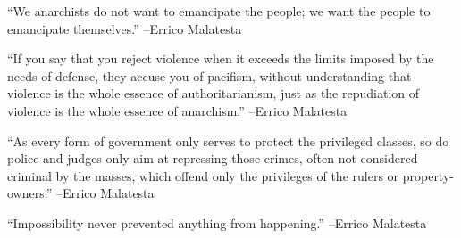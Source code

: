 \documentclass{article}%
\begin{document}
\linebreak%
\vspace{1mm}%
\begin{minipage}{\textwidth}%
\flushleft%
“We anarchists do not want to emancipate the people; we want the people to emancipate themselves.”%
\linebreak%
\vspace{1mm}%
–Errico Malatesta%
\linebreak%
\vspace{1mm}%
\end{minipage}%
\linebreak%
\vspace{1mm}%
\begin{minipage}{\textwidth}%
\flushleft%
“If you say that you reject violence when it exceeds the limits imposed by the needs of defense, they accuse you of pacifism, without understanding that violence is the whole essence of authoritarianism, just as the repudiation of violence is the whole essence of anarchism.”%
\linebreak%
\vspace{1mm}%
–Errico Malatesta%
\linebreak%
\vspace{1mm}%
\end{minipage}%
\linebreak%
\vspace{1mm}%
\begin{minipage}{\textwidth}%
\flushleft%
“As every form of government only serves to protect the privileged classes, so do police and judges only aim at repressing those crimes, often not considered criminal by the masses, which offend only the privileges of the rulers or property{-}owners.”%
\linebreak%
\vspace{1mm}%
–Errico Malatesta%
\linebreak%
\vspace{1mm}%
\end{minipage}%
\linebreak%
\vspace{1mm}%
\begin{minipage}{\textwidth}%
\flushleft%
“Impossibility never prevented anything from happening.”%
\linebreak%
\vspace{1mm}%
–Errico Malatesta%
\linebreak%
\vspace{1mm}%
\end{minipage}%
\linebreak%
\end{document}
